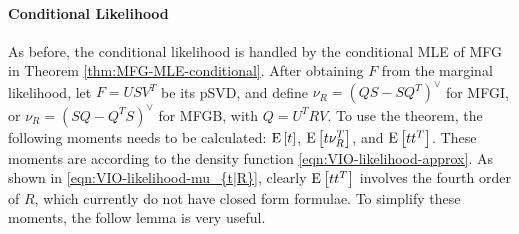\paragraph{Conditional Likelihood}

As before, the conditional likelihood is handled by the conditional MLE of MFG in Theorem \ref{thm:MFG-MLE-conditional}.
After obtaining $F$ from the marginal likelihood, let $F = USV^T$ be its pSVD, and define $\nu_R = (QS-SQ^T)^\vee$ for MFGI, or $\nu_R = (SQ-Q^TS)^\vee$ for MFGB, with $Q = U^TRV$.
To use the theorem, the following moments needs to be calculated: $\mathrm{E}\left[ t \right]$, $\mathrm{E}\left[ t\nu_R^T \right]$, and $\mathrm{E}\left[ tt^T \right]$.
These moments are according to the density function \eqref{eqn:VIO-likelihood-approx}.
As shown in \eqref{eqn:VIO-likelihood-mu_{t|R}}, clearly $\mathrm{E}\left[ tt^T \right]$ involves the fourth order of $R$, which currently do not have closed form formulae.
To simplify these moments, the follow lemma is very useful.

